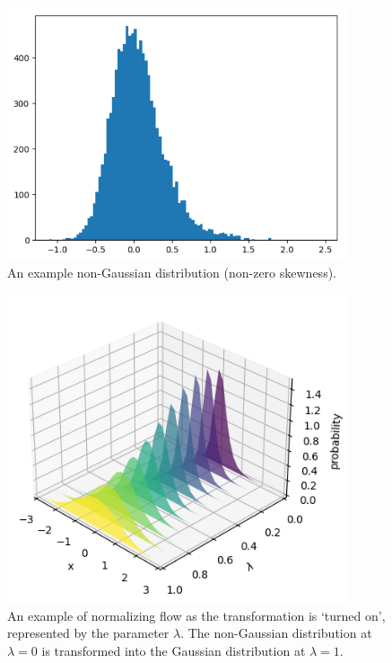 \begin{figure}[ht]
	\centering
	\includegraphics[width=0.9\textwidth]{plots/t=1.png}
	\caption{An example non-Gaussian distribution (non-zero skewness).}
	\label{fig:non-gauss}
\end{figure}
\begin{figure}[ht]
	\centering
	\includegraphics[width=0.9\textwidth]{plots/3d_flow.png}
	\caption{An example of normalizing flow as the transformation is `turned on', represented by the parameter $\lambda$. The non-Gaussian distribution at $\lambda=0$ is transformed into the Gaussian distribution at $\lambda=1$.}
	\label{fig:NF}
\end{figure}